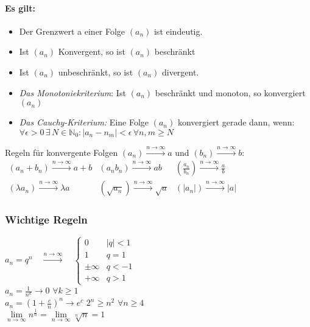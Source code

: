 \documentclass[6pt,a4paper]{scrartcl}
\newcommand{\abs}[1]{\ensuremath{\left\vert#1\right\vert}}
\begin{document}
\begin{multicols*}{4}
\paragraph{Es gilt:}
\begin{itemize}\itemsep0pt
\item Der Grenzwert a einer Folge $(a_n)$ ist eindeutig.
\item Ist $(a_n)$ Konvergent, so ist $(a_n)$ beschränkt
\item Ist $(a_n)$ unbeschränkt, so ist $(a_n)$ divergent.
\item \emph{Das Monotoniekriterium}: Ist $(a_n)$ beschränkt und monoton, so konvergiert $(a_n)$
\item \emph{Das Cauchy-Kriterium:} Eine Folge $(a_n)$ konvergiert gerade dann, wenn: \\ $\forall \epsilon >0 \, \exists \,  N \in \mathbb N_0: \abs{a_n - n_m} < \epsilon \, \forall n, m \ge N$
\end{itemize}
Regeln für konvergente Folgen $(a_n) \overset{n \rightarrow \infty}{\longrightarrow} a$ und $(b_n) \overset{n \rightarrow \infty}{\longrightarrow} b$:\\
$\begin{array}{lll}
(a_n+b_n) \overset{n \rightarrow \infty}{\longrightarrow} a+b & (a_n b_n) \overset{n \rightarrow \infty}{\longrightarrow} ab & (\frac{a_n}{b_n}) \overset{n \rightarrow \infty}{\longrightarrow} \frac{a}{b}\\
(\lambda a_n) \overset{n \rightarrow \infty}{\longrightarrow} \lambda a & (\sqrt{a_n}) \overset{n \rightarrow \infty}{\longrightarrow} \sqrt{a} & (|a_n|) \overset{n \rightarrow \infty}{\longrightarrow} |a|
\end{array}$

\subsubsection{Wichtige Regeln}
$a_n=q^n \quad \overset{n \rightarrow \infty}{\longrightarrow} \quad \begin{cases} 0 & |q|<1 \\ 1 & q=1 \\ \pm \infty & q < -1  \\  + \infty & q > 1\end{cases}$ \\
$a_n=\frac{1}{n^k}\rightarrow 0$ \qquad $\forall k \ge 1$\\ 
$a_n=\left(1+\frac{c}{n}\right)^n \rightarrow e^c$ \qquad \qquad \qquad $2^n \ge n^2$ \quad $\forall n\ge 4$ \\
$\lim\limits_{n\to\infty}n^{\frac{1}{n}}=\lim\limits_{n\to\infty}\sqrt[n]{n}=1$



\end{multicols*}
\end{document}
